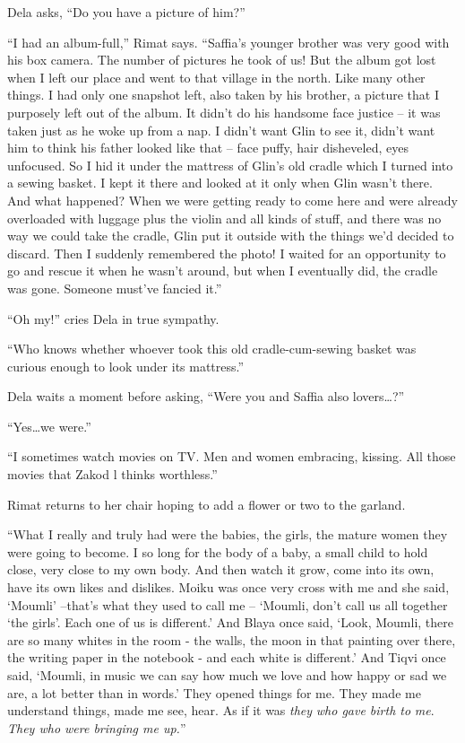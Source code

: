 \documentclass[twoside,11pt]{book}
\begin{document}
Dela asks, ``Do you have a picture of him?''

``I had an album-full,'' Rimat says. ``Saffia's younger brother was very good
with his box camera. The number of pictures he took of us! But the album got lost when I left our place and went to
 that village in the north. Like many other things. I had only one snapshot left, also taken by his brother, a picture
that I purposely left out of the album. It didn't do his handsome face justice -- it was taken just as he woke up from
a nap. I didn't want Glin to see it, didn't want him to think his father looked like that -- face puffy, hair
disheveled, eyes unfocused. So I hid it under the mattress of Glin's old cradle which I turned into a sewing basket. I
kept it there and looked at it only when Glin wasn't there. And what happened? When we were getting ready to come here
and were already overloaded with luggage plus the violin and all kinds of stuff, and there was no way we could take the
cradle, Glin put it outside with the things we'd decided to discard. Then I suddenly remembered the photo! I waited for
an opportunity to go and rescue it when he wasn't around, but when I eventually did, the cradle was gone. Someone
must've fancied it.''

``Oh my!'' cries Dela in true sympathy.

``Who knows whether whoever took this old cradle-cum-sewing basket was curious enough to look under its
mattress.''

Dela waits a moment before asking, ``Were you and Saffia also lovers{\ldots}?''

``Yes{\dots}we were.''

``I sometimes watch movies on TV. Men and women embracing, kissing. All those movies that Zakod l thinks
worthless.''

Rimat returns to her chair hoping to add a flower or two to the garland.

``What I really and truly had were the babies, the girls, the mature women they were going to become. I so
long for the body of a baby, a small child to hold close, very close to my own body. And then watch it grow, come into
its own, have its own likes and dislikes. Moiku was once very cross with me and she said, `Moumli' --that's what they
used to call me -- `Moumli, don't call us all together `the girls'. Each one of us is different.' And Blaya once
said, `Look, Moumli, there are so many whites in the room - the walls, the moon in that painting over there, the
writing paper in the notebook - and each white is different.' And Tiqvi once said, `Moumli, in music we can say how
much we love and how happy or sad we are, a lot better than in words.' They opened things for me. They made me
understand things, made me see, hear. As if it was \textit{they} \textit{who gave birth to} \textit{me}. \textit{They
who were bringing me up.}''
\end{document}
